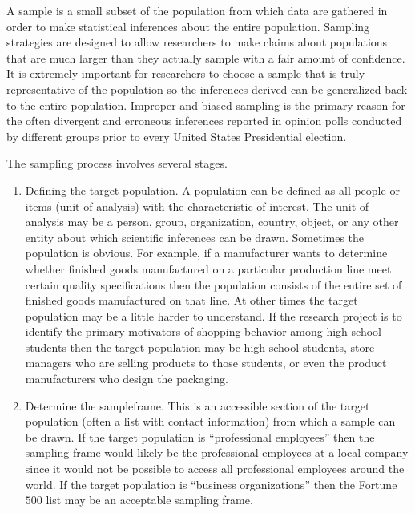 A \gls{sample} is a small subset of the population from which data are gathered in order to make statistical inferences about the entire population. Sampling strategies are designed to allow researchers to make claims about populations that are much larger than they actually sample with a fair amount of confidence. It is extremely important for researchers to choose a sample that is truly representative of the population so the inferences derived can be generalized back to the entire population. Improper and biased sampling is the primary reason for the often divergent and erroneous inferences reported in opinion polls conducted by different groups prior to every United States Presidential election.

The sampling process involves several stages. 

\begin{enumerate}
	\item Defining the target population. A population can be defined as all people or items (unit of analysis) with the characteristic of interest. The unit of analysis may be a person, group, organization, country, object, or any other entity about which scientific inferences can be drawn. Sometimes the population is obvious. For example, if a manufacturer wants to determine whether finished goods manufactured on a particular production line meet certain quality specifications then the population consists of the entire set of finished goods manufactured on that line. At other times the target population may be a little harder to understand. If the research project is to identify the primary motivators of shopping behavior among high school students then the target population may be high school students, store managers who are selling products to those students, or even the product manufacturers who design the packaging. 

	\item Determine the \gls{sampleframe}. This is an accessible section of the target population (often a list with contact information) from which a sample can be drawn. If the target population is ``professional employees'' then the sampling frame would likely be the professional employees at a local company since it would not be possible to access all professional employees around the world. If the target population is ``business organizations'' then the Fortune $ 500 $ list may be an acceptable sampling frame.


\end{enumerate}
